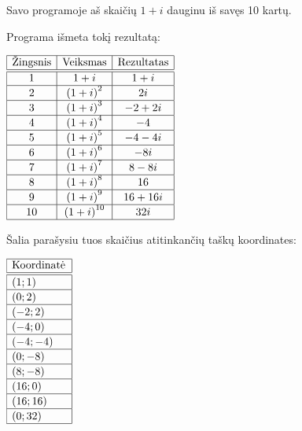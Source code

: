 \documentclass[a4paper]{article}
\begin{document}
Savo programoje aš skaičių $1+i$ dauginu iš savęs 10 kartų. 
\newline
\newline
\begin{minipage}[b]{0.3\textwidth}
Programa išmeta tokį rezultatą:

$\begin{array}{|c|c|c|}\hline
\text{Žingsnis} & \text{Veiksmas} & \text{Rezultatas} \\ \hline \hline
1&1 + i&1 + i\\ \hline
2&\left(1 + i\right)^{2}&2 i\\ \hline
3&\left(1 + i\right)^{3}&-2 + 2 i\\ \hline
4&\left(1 + i\right)^{4}&-4\\ \hline
5&\left(1 + i\right)^{5}&-4 - 4 i\\ \hline
6&\left(1 + i\right)^{6}&- 8 i\\ \hline
7&\left(1 + i\right)^{7}&8 - 8 i\\ \hline
8&\left(1 + i\right)^{8}&16\\ \hline
9&\left(1 + i\right)^{9}&16 + 16 i\\ \hline
10&\left(1 + i\right)^{10}&32 i\\ \hline
\end{array}$
\end{minipage}
\hspace{\fill}
\begin{minipage}[b]{0.6\textwidth}
Šalia parašysiu tuos skaičius atitinkančių taškų koordinates:

$\begin{array}{|l|}\hline
\text{Koordinatė}\\ \hline \hline
(1;1)\phantom{\left(\right)^2}\\ \hline
(0;2)\phantom{\left(\right)^2}\\ \hline
(-2;2)\phantom{\left(\right)^2}\\ \hline
(-4;0)\phantom{\left(\right)^2}\\ \hline
(-4;-4)\phantom{\left(\right)^2}\\ \hline
(0;-8)\phantom{\left(\right)^2}\\ \hline
(8;-8)\phantom{\left(\right)^2}\\ \hline
(16;0)\phantom{\left(\right)^2}\\ \hline
(16;16)\phantom{\left(\right)^2}\\ \hline
(0;32)\phantom{\left(\right)^2}\\ \hline
\end{array}$
\end{minipage}
\end{document}
